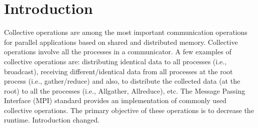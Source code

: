 \documentclass[sigplan,review,anonymous]{acmart}\settopmatter{printfolios=true,printccs=false,printacmref=false}
\begin{document}
\section{Introduction}
Collective operations are among the most important communication operations for parallel applications based on shared and distributed memory. Collective  operations involve all the processes in a communicator. A few examples of collective operations are: distributing identical data to all processes (i.e., broadcast), receiving different/identical data from all processes at the root process (i.e., gather/reduce) and also, to distribute the collected data (at the root) to all the processes (i.e., Allgather, Allreduce), etc. The Message Passing Interface (MPI) standard
provides an implementation of commonly used collective operations. The primary objective of these operations is to decrease the runtime. Introduction changed.


\end{document}
